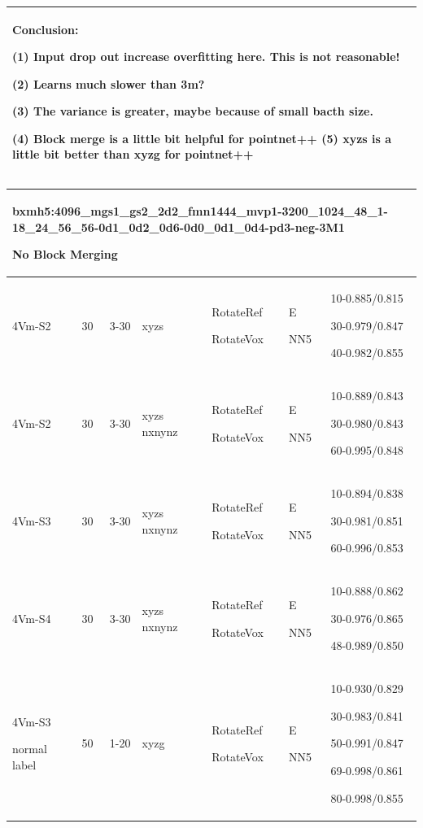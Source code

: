 \documentclass{article}
\begin{document}
\begin{tabular}{|p{1.5cm}|p{1.5cm}|p{1cm}|p{1.5cm}|p{1.5cm}|p{1.5cm}|p{5cm}| }
	\multicolumn{7}{|p{16cm}|}{ Conclusion:\par	
	(1) Input drop out increase overfitting here. This is not reasonable!\par
	(2) Learns much slower than 3m?\par 
	(3) The variance is greater, maybe because of small bacth size.\par 
	(4) Block merge is a little bit helpful for pointnet++
	(5) xyzs is a little bit better than xyzg for pointnet++ } \\
	\hline 
	
\end{tabular}

\noindent
\begin{tabular}{|p{1.5cm}|p{1.5cm}|p{1cm}|p{1.5cm}|p{1.5cm}|p{1.5cm}|p{5cm}| }
	\hline 
	\multicolumn{7}{|p{14cm}|}{bxmh5:4096\_mgs1\_gs2\_2d2\_fmn1444\_mvp1-3200\_1024\_48\_1-18\_24\_56\_56-0d1\_0d2\_0d6-0d0\_0d1\_0d4-pd3-neg-3M1\par No Block Merging }\\
	\hline
	4Vm-S2 & 30 & 3-30 & xyzs & RotateRef\par RotateVox & E\par NN5 & 10-0.885/0.815\par 30-0.979/0.847 \par40-0.982/0.855\\
	\hline
	4Vm-S2 & 30 & 3-30 & xyzs nxnynz & RotateRef\par RotateVox & E\par NN5 & 10-0.889/0.843\par 30-0.980/0.843\par 60-0.995/0.848\\
	\hline
	4Vm-S3 & 30 & 3-30 & xyzs nxnynz & RotateRef\par RotateVox & E\par NN5 & 10-0.894/0.838\par 30-0.981/0.851\par 60-0.996/0.853\\
	\hline
	4Vm-S4 & 30 & 3-30 & xyzs nxnynz & RotateRef\par RotateVox & E\par NN5 & 10-0.888/0.862\par 30-0.976/0.865\par 48-0.989/0.850\\
	\hline\hline
	4Vm-S3\par normal label & 50 & 1-20 & xyzg& RotateRef\par RotateVox & E\par NN5 & 10-0.930/0.829\par 30-0.983/0.841\par 50-0.991/0.847\par 69-0.998/0.861\par 80-0.998/0.855\\

\end{tabular}
\end{document}

